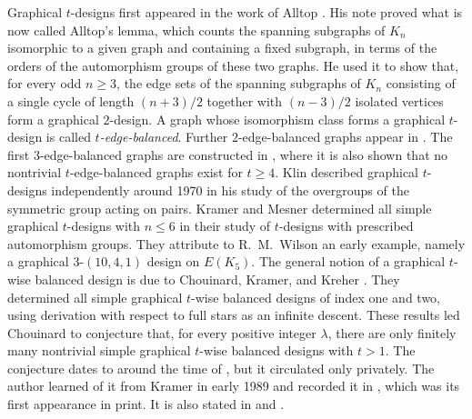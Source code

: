 \documentclass[12pt]{amsart}
\theoremstyle{definition}
\begin{document}
Graphical $t$-designs first appeared in the work of Alltop
\cite{Alltop1966}. His note proved what is now called Alltop's lemma, which
counts the spanning subgraphs of $K_n$ isomorphic to a given graph and
containing a fixed subgraph, in terms of the orders of the automorphism
groups of these two graphs. He used it to show that, for every odd $n \geq
3$, the edge sets of the spanning subgraphs of $K_n$ consisting of a single
cycle of length $(n+3)/2$ together with $(n-3)/2$ isolated vertices form a
graphical $2$-design. A graph whose isomorphism class forms a graphical
$t$-design is called \emph{$t$-edge-balanced}. Further $2$-edge-balanced
graphs appear in \cite{Caliskan2016, CaliskanChee2014}. The first
$3$-edge-balanced graphs are constructed in \cite{Chee2026}, where it is
also shown that no nontrivial $t$-edge-balanced graphs exist for $t \geq 4$.
Klin \cite{Klin1970} described graphical $t$-designs independently around
1970 in his study of the overgroups of the symmetric group acting on pairs.
Kramer and Mesner \cite{KramerMesner1976} determined all simple graphical
$t$-designs with $n \leq 6$ in their study of $t$-designs with prescribed
automorphism groups. They attribute to R.~M.~Wilson an early example, namely
a graphical $3$-$(10,4,1)$ design on $E(K_5)$. The general notion of a
graphical $t$-wise balanced design is due to Chouinard, Kramer, and Kreher
\cite{CKK1983}. They determined all simple graphical $t$-wise balanced
designs of index one and two, using derivation with respect to full stars as
an infinite descent. These results led Chouinard to conjecture that, for
every positive integer $\lambda$, there are only finitely many nontrivial
simple graphical $t$-wise balanced designs with $t > 1$. The conjecture
dates to around the time of \cite{CKK1983}, but it circulated only
privately. The author learned of it from Kramer in early 1989 and recorded
it in \cite{Chee1991}, which was its first appearance in print. It is also
stated in \cite{Chouinard1996} and \cite[Conjecture 1.2]{CheeKaski2008}.
\end{document}
